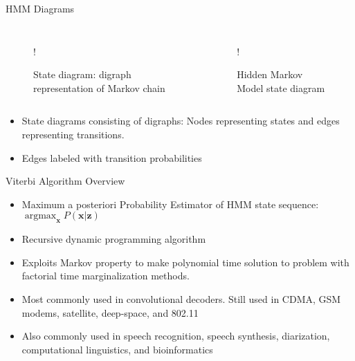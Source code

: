 \documentclass[xetex,mathserif,serif]{beamer}
\DeclareMathOperator*{\argmax}{argmax}
\begin{document}
\begin{frame}{HMM Diagrams}
    \begin{columns}[c] %
        \begin{figure}
            \resizebox {\columnwidth} {!} {}
            \caption{State diagram: digraph representation of Markov chain}
        \end{figure}

        \begin{figure}
            \resizebox {\columnwidth} {!}{  }
            \caption{Hidden Markov Model state diagram}
        \end{figure}
    \end{columns}
    \begin{itemize}
        \item State diagrams consisting of digraphs: Nodes representing states
              and edges representing transitions.
        \item Edges labeled with transition probabilities
    \end{itemize}
\end{frame}

\begin{frame}{Viterbi Algorithm Overview}
    \begin{itemize}
    \item Maximum a posteriori Probability Estimator of HMM state sequence:
          $\argmax_{\mathbf x} P(\mathbf x | \mathbf z)$
    \item Recursive dynamic programming algorithm
    \item Exploits Markov property to make polynomial time solution to problem
          with factorial time marginalization methods.
    \item Most commonly used in convolutional decoders. Still used in CDMA,
          GSM modems, satellite, deep-space, and 802.11
    \item Also commonly used in speech recognition, speech synthesis,
          diarization, computational linguistics, and bioinformatics
    \end{itemize}
\end{frame}
\end{document}
